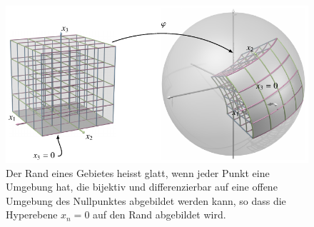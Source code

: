%
%
\begin{figure}
\centering
\includegraphics{chapters/040-felder/images/randdef.pdf}
\caption{Der Rand eines Gebietes heisst glatt, wenn jeder Punkt eine
Umgebung hat, die bijektiv und differenzierbar auf eine offene Umgebung
des Nullpunktes abgebildet werden kann, so dass die Hyperebene $x_n=0$
auf den Rand abgebildet wird.
\label{buch:felder:fundamentallemma:fig:randdef}}
\end{figure}
